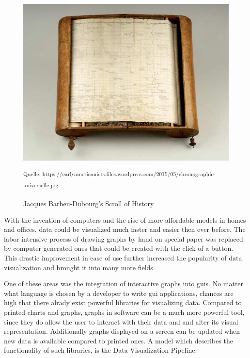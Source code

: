 \begin{figure}[h]
    \centering
    \includegraphics[width=12cm]{resources/img/ScrollOfHistory}
    \caption{Jacques Barbeu-Dubourg's Scroll of History}
    \small\textsuperscript{Quelle: https://earlyamericanists.files.wordpress.com/2015/05/chronographie-universelle.jpg}
    \label{fig:historyscroll}
\end{figure}

With the invention of computers and the rise of more affordable models in homes and offices, data could be visualized much faster and easier then ever before. The labor intensive process of drawing graphs by hand on special paper was replaced by computer generated ones that could be created with the click of a button. This drastic improvement in ease of use further increased the popularity of data visualization and brought it into many more fields.
\cite{DataVisHistory2}

One of these areas was the integration of interactive graphs into \glspl{gui}. No matter what language is chosen by a developer to write \gls{gui} applications, chances are high that there alrady exist powerful libraries for visualizing data. Compared to printed charts and graphs, graphs in software can be a much more powerful tool, since they do allow the user to interact with their data and and alter its visual representation. Additionally graphs displayed on a screen can be updated when new data is available compared to printed ones. A model which describes the functionality of such libraries, is the Data Visualization Pipeline.
\cite{VisIdioms}





